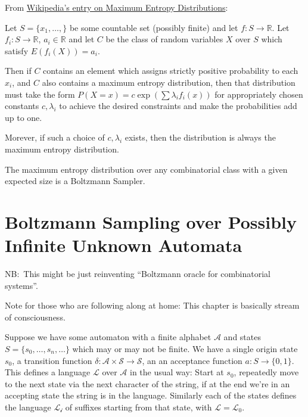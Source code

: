 From \href{https://en.wikipedia.org/wiki/Maximum_entropy_probability_distribution#Discrete_version}{Wikipedia's entry on Maximum Entropy Distributions}:

\begin{theorem}
Let \(S = \{x_1, \ldots, \}\) be some countable set (possibly finite) and let \(f: S \to \mathbb{R}\).
Let \(f_i: S \to \mathbb{R}\), \(a_i \in \mathbb{R}\) and let \(C\) be the class of random variables \(X\) over \(S\) which satisfy \(E(f_i(X)) = a_i\).

Then if \(C\) contains an element which assigns strictly positive probability to each \(x_i\), and \(C\) also contains a maximum entropy distribution,
then that distribution must take the form \(P(X = x) = c \exp\left( \sum \lambda_i f_i(x)  \right)\) for appropriately chosen constants \(c, \lambda_i\) to achieve the desired constraints and make the probabilities add up to one.

Morever, if such a choice of \(c, \lambda_i\) exists, then the distribution is always the maximum entropy distribution.
\end{theorem}

\begin{corollary}
The maximum entropy distribution over any combinatorial class with a given expected size is a Boltzmann Sampler.
\end{corollary}

\section{Boltzmann Sampling over Possibly Infinite Unknown Automata}

NB:\ This might be just reinventing ``Boltzmann oracle for combinatorial systems''\cite{pivoteau2008boltzmann}.

Note for those who are following along at home:
This chapter is basically stream of consciousness.

Suppose we have some automaton with a finite alphabet \(\mathcal{A}\) and states \(S = \{s_0, \ldots, s_n, \ldots\}\) which may or may not be finite.
We have a single origin state \(s_0\),
a transition function \(\delta: \mathcal{A} \times \mathcal{S} \to \mathcal{S}\),
an an acceptance function \(a: S \to \{0, 1\}\).
This defines a language \(\mathcal{L}\) over \(\mathcal{A}\) in the usual way:
Start at \(s_0\), repeatedly move to the next state via the next character of the string,
if at the end we're in an accepting state the string is in the language.
Similarly each of the states defines the language \(\mathcal{L_i}\) of suffixes starting from that state,
with \(\mathcal{L} = \mathcal{L}_0\).

